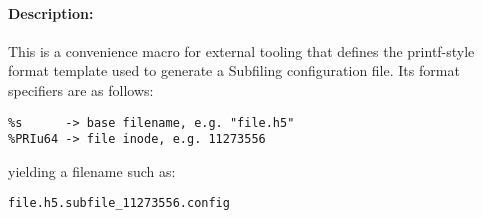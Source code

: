 \documentclass[../main.tex]{subfiles}
\begin{document}
\paragraph{Description:}
\begin{flushleft}%
This is a convenience macro for external tooling that defines the printf-style
format template used to generate a Subfiling configuration file. Its format specifiers
are as follows:

\begin{verbatim}
%s      -> base filename, e.g. "file.h5"
%PRIu64 -> file inode, e.g. 11273556
\end{verbatim}

yielding a filename such as:

\begin{verbatim}
file.h5.subfile_11273556.config
\end{verbatim}
\end{flushleft}%

\newpage
\end{document}
